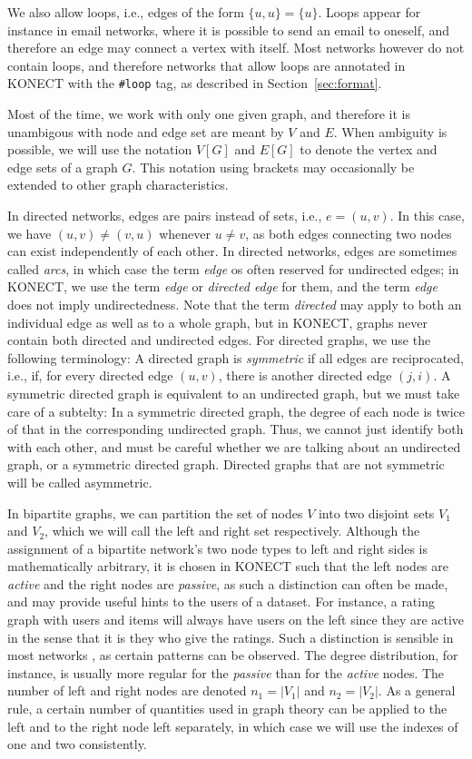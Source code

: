 \documentclass{article}
\begin{document}
We also allow loops, i.e., edges of the form $\{u,u\}=\{u\}$.  Loops
appear for instance in email networks, where it is possible to send an
email to oneself, and therefore an edge may connect a vertex with
itself.  Most networks however do not contain loops, and therefore
networks that allow loops are annotated in KONECT with the 
\texttt{\#loop} tag, as described in Section~\ref{sec:format}. 

Most of the time, we work with only one given graph, and therefore it is
unambigous with node and edge set are meant by $V$ and $E$.  When
ambiguity is possible, we will use the notation
$V[G]$ and $E[G]$ to denote the vertex and edge sets of a graph $G$.
This notation using brackets may occasionally be extended to other graph
characteristics. 

In directed networks, edges are pairs instead of sets, i.e.,
$e=(u,v)$.  In this case, we have $(u,v)\neq(v,u)$ whenever $u \neq v$, 
as both edges connecting two nodes can exist independently of each
other. 
In directed networks, edges are sometimes called
\emph{arcs}, in which case the term \emph{edge} os often reserved for
undirected edges; in KONECT, we use the term \emph{edge} or \emph{directed
  edge} for them, and the term \emph{edge} does not imply
undirectedness.  Note that the term \emph{directed} may apply to both an
individual edge as well as to a whole graph, but in KONECT, graphs never
contain both directed and undirected edges.  
For directed graphs, we use the following terminology:  A directed graph
is \emph{symmetric} if all edges are reciprocated, i.e., if, for every
directed edge $(u,v)$, there is another directed edge $(j,i)$.  A
symmetric directed graph is equivalent to an undirected graph, but we
must take care of a subtelty:  In a symmetric directed graph, the degree
of each node is twice of that in the corresponding undirected graph.
Thus, we cannot just identify both with each other, and must be careful
whether we are talking about an undirected graph, or a symmetric
directed graph.  Directed graphs that are not symmetric will be called
asymmetric. 

In bipartite graphs, we can partition the set of nodes $V$ into two
disjoint sets $V_1$ and $V_2$, which we will call the left and right
set respectively.  Although the assignment of a bipartite network's two
node types to left and right sides is mathematically arbitrary, it is
chosen in KONECT such that the left nodes are \emph{active} and the
right nodes are \emph{passive}, as such a distinction can often be made,
and may provide useful hints to the users of a dataset.  For instance, a rating graph with users
and items will always have users on the left since they are active in
the sense that it is they who give the ratings. 
Such a distinction is sensible in most networks \citep{b732}, as certain
patterns can be observed.  The degree distribution, for instance, is
usually more regular for the \emph{passive} than for the \emph{active} nodes.
The number of left and
right nodes are denoted $n_1 = |V_1|$ and $n_2 = |V_2|$.  As a general
rule, a certain number of quantities used in graph theory can be applied
to the left and to the right node left separately, in which case we will
use the indexes of one and two consistently. 
\end{document}
